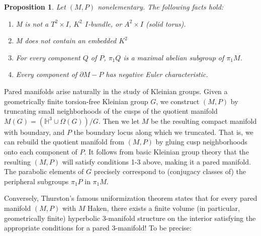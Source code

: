 \documentclass[12pt]{amsart}
\newtheorem{prop}[theorem]{Proposition}
\theoremstyle{definition}
\newcommand{\x}{\times}
\newcommand{\bd}{\partial}
\newcommand{\Om}{\Omega}
\begin{document}
\begin{prop}

Let $(M,P)$ nonelementary. The following facts hold:

\begin{enumerate}
\item M is not a $T^2\x I$, $K^2$ $I$-bundle, or $A^2\x I$ (solid torus).
\item M does not contain an embedded $K^2$
\item For every component $Q$ of $P$, $\pi_1Q$ is a maximal abelian subgroup of
$\pi_1M$.
\item Every component of $\bd M-P$ has negative Euler characteristic.
\end{enumerate}

\end{prop}

Pared manifolds arise naturally in the study of Kleinian groups. Given
a geometrically finite torsion-free Kleinian group $G$, we construct $(M,P)$ by
truncating small neighborhoods of the cusps of the quotient manifold $M(G)
= \left(\mathbb{H}^3\cup \Om(G)\right)/G$.  Then we let $M$ be the resulting
compact manifold with boundary, and $P$ the boundary locus along which we
truncated.  That is, we can rebuild the quotient manifold from $(M,P)$ by
gluing cusp neighborhoods onto each component of $P$. It follows from basic
Kleinian group theory that the resulting $(M,P)$ will satisfy conditions 1-3
above, making it a pared manifold.  The parabolic elements of $G$ precisely
correspond to (conjugacy classes of) the peripheral subgroups $\pi_1P$ in
$\pi_1M$.

Conversely, Thurston's famous uniformization theorem states that for every
pared manifold $(M,P)$ with $M$ Haken, there exists a finite volume (in
particular, geometrically finite) hyperbolic 3-manifold structure on the
interior satisfying the appropriate conditions for a pared 3-manifold! To be
precise:


\end{document}
